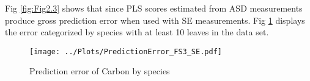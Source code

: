 Fig \ref{fig:Fig2.3} shows that since PLS scores estimated from ASD measurements produce gross prediction error when used with SE measurements. Fig \ref{fig:Fig2.4} displays the error categorized by species with at least 10 leaves in the data set.

\begin{figure}[H]
\centering
\texttt{[image: ../Plots/PredictionError\_FS3\_SE.pdf]}
\caption{Prediction error of Carbon by species}
\label{fig:Fig2.4}
\end{figure}
